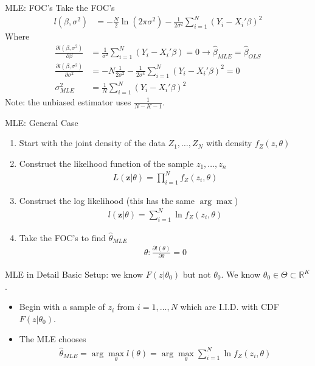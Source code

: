 \documentclass[aspectratio=169]{beamer}
\begin{document}
\begin{frame}{MLE: FOC's}
Take the FOC's
\begin{align*}
l(\beta,\sigma^2) &= -\frac{N}{2} \ln (2 \pi \sigma^2) - \frac{1}{2 \sigma^2} \sum_{i=1}^N(Y_i - X_i' \beta)^2
\end{align*}
Where 
\begin{align*} 
\frac{ \partial l(\beta,\sigma^2) }{\partial \beta}&= \frac{1}{ \sigma^2}\sum_{i=1}^N(Y_i - X_i' \beta) = 0 \rightarrow \widehat{\beta}_{MLE}= \widehat{\beta}_{OLS}\\ 
\frac{ \partial l(\beta,\sigma^2) }{\partial \sigma^2}&= -N \frac{1}{2 \sigma^2}  -  \frac{1}{2 \sigma^4} \sum_{i=1}^N(Y_i - X_i' \beta)^2 = 0 \\
\sigma^2_{MLE} &= \frac{1}{N} \sum_{i=1}^N (Y_i - X_i' \beta)^2
\end{align*}
Note: the unbiased estimator uses $\frac{1}{N-K-1}$.
\end{frame}

\begin{frame}{MLE: General Case}
\begin{enumerate}
\item Start with the \alert{joint density of the data} $Z_1,\ldots,Z_N$ with density $f_Z(z,\theta)$
\item Construct the likelhood function of the sample $z_1,\ldots,z_n$
\begin{align*}
L(\mathbf{z} | \theta) = \prod_{i=1}^N f_Z(z_i,\theta)
\end{align*}
\item Construct the \alert{log likelihood} (this has the same $\arg \max$)
\begin{align*}
l(\mathbf{z} | \theta) = \sum_{i=1}^N \ln f_Z(z_i,\theta)
\end{align*}
\item Take the FOC's to find $\widehat{\theta}_{MLE}$
\begin{align*}
\theta : \frac{\partial l(\theta)}{\partial \theta} =0
\end{align*}
\end{enumerate}
\end{frame}

\begin{frame}{MLE in Detail}
Basic Setup: we know $F(z|\theta_0)$ but not $\theta_0$. We know $\theta_0 \in \Theta \subset \mathbb{R}^K$.
\begin{itemize}
\item Begin with a sample of $z_i$ from $i=1,\ldots,N$ which are I.I.D. with CDF $F(z|\theta_0)$.
\item The MLE chooses
\begin{align*}
\widehat{\theta}_{MLE} = \arg \max_{\theta} l(\theta) = \arg \max_{\theta} \sum_{i=1}^N \ln f_Z(z_i,\theta)
\end{align*}
\end{itemize}
\end{frame}
\end{document}
